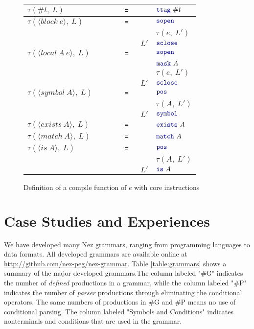 \documentclass[preprint]{sigplanconf}
\newcommand{\kw}[1]{{\tt {\color{darkblue} #1}}}
\begin{document}
\begin{figure}[tb]
\begin{small}
\begin{center}
\begin{tabular}{lrrl}
$\tau(\#t,\: L)$ &  \verb|      = | & & $\kw{ttag}~\#t$  \\ \hline

$\tau(\langle block~e\rangle,\: L)$ &  \verb|      = | & & $\kw{sopen}$  \\
& & & $\tau(e,\: L')$  \\
&  & $L'$  & $\kw{sclose}$  \\

$\tau(\langle local~A~e\rangle,\: L)$ &  \verb|      = | & & $\kw{sopen}$  \\
& & & $\kw{mask}~A$  \\
& & & $\tau(e,\: L')$  \\
&  & $L'$  & $\kw{sclose}$  \\

$\tau(\langle symbol~A\rangle,\: L)$ &  \verb|      = | & & $\kw{pos}$  \\
& & & $\tau(A,\: L')$  \\
&  & $L'$  & $\kw{symbol}$  \\

$\tau(\langle exists~A\rangle,\: L)$ &  \verb|      = | & & $\kw{exists}~A$  \\
$\tau(\langle match~A\rangle,\: L)$ &  \verb|      = | & & $\kw{match}~A$  \\

$\tau(\langle is~A\rangle,\: L)$ &  \verb|      = | & & $\kw{pos}$  \\
& & & $\tau(A,\: L')$  \\
&  & $L'$  & $\kw{is}~A$  \\
\end{tabular}

\end{center}

\end{small}

\caption{Definition of a compile function of $e$ with core instructions}
\label{fig:compile}

\end{figure}

\section{Case Studies and Experiences} \label{sec:casestudies}

We have developed many Nez grammars, ranging from programming languages to data formats. All developed grammars are available online at \url{http://github.com/nez-peg/nez-grammar}. 
Table \ref{table:grammars} shows a summary of the major developed grammars.The column labeled "\#G" indicates the number of {\em defined} productions in a grammar, while the column labeled "\#P" indicates the number of {\em parser} productions through eliminating the conditional operators. 
The same numbers of productions in \#G and \#P means no use of conditional parsing. 
The column labeled "Symbols and Conditions" indicates nonterminals and conditions that are used in the grammar.
\end{document}
